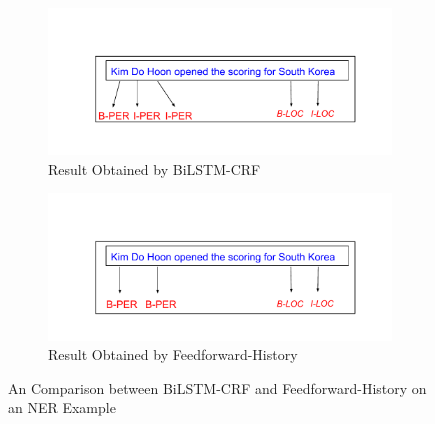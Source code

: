 \begin{figure}
\begin{subfigure}{\linewidth}
\includegraphics[width=0.9\linewidth]{NERbilstm.pdf}
\vspace{-1cm}
\caption{Result Obtained by BiLSTM-CRF}
\end{subfigure}\par\medskip
\begin{subfigure}{\linewidth}
\vspace{-2cm}
\includegraphics[width=0.9\linewidth]{NERff.pdf}
\vspace{-1cm}
\caption{Result Obtained by Feedforward-History}
\end{subfigure}
\caption{An Comparison between BiLSTM-CRF and Feedforward-History on an NER Example}
\label{fig:comp1}
\end{figure}

